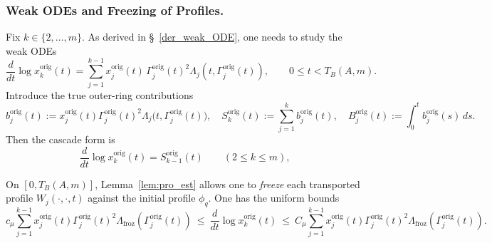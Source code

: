 \documentclass[reqno,11pt]{amsart}
\begin{document}
 
\subsubsection{Weak ODEs and Freezing of Profiles.}
\label{subsec:freez_prof}
Fix $k\in\{2,\dots,m\}$.  As derived in \S~\ref{der_weak_ODE}, one needs to study the weak ODEs
\begin{equation}
\label{original_ODEs2}
\frac{d}{dt} \log x_k^{\mathrm{orig}}(t)
=
\sum_{j=1}^{k-1} x_j^{\mathrm{orig}}(t)\,\Gamma_j^{\mathrm{orig}}(t)^2
\Lambda_j(t,\Gamma_j^{\mathrm{orig}}(t)),
\qquad 0\le t<T_B(A,m).
\end{equation}
Introduce the true outer-ring contributions
\begin{equation*}
b_j^{\mathrm{orig}}(t):=x_j^{\mathrm{orig}}(t)\Gamma_j^{\mathrm{orig}}(t)^2\Lambda_j\bigl(t,\Gamma_j^{\mathrm{orig}}(t)\bigr),
\quad
S_k^{\mathrm{orig}}(t):=\sum_{j=1}^k b_j^{\mathrm{orig}}(t),
\quad
B_j^{\mathrm{orig}}(t):=\int_0^t b_j^{\mathrm{orig}}(s)\,ds.
\end{equation*}
Then the cascade form is
\begin{equation}
\label{eq:orig_ODE_cascade_form}
\frac{d}{dt}\log x_k^{\mathrm{orig}}(t)=S_{k-1}^{\mathrm{orig}}(t)\qquad (2\le k\le m),
\end{equation}

On $[0,T_B(A,m)]$, Lemma~\ref{lem:pro_est} allows one to \emph{freeze} each transported profile
$W_j(\cdot,\cdot,t)$ against the initial profile $\phi_q$.
One has the uniform bounds
\begin{equation}
\label{mu_ODE}
c_\mu
\sum_{j=1}^{k-1} x_j^{\mathrm{orig}}(t)\Gamma_j^{\mathrm{orig}}(t)^2 \Lambda_{\mathrm{froz}}(\Gamma_j^{\mathrm{orig}}(t))
\ \leq\
\frac{d}{dt}\log x_k^{\mathrm{orig}} (t)
\ \leq\
C_\mu \sum_{j=1}^{k-1} x_j^{\mathrm{orig}}(t)\Gamma_j^{\mathrm{orig}}(t)^2 \Lambda_{\mathrm{froz}}(\Gamma_j^{\mathrm{orig}}(t)).
\end{equation}
\end{document}
